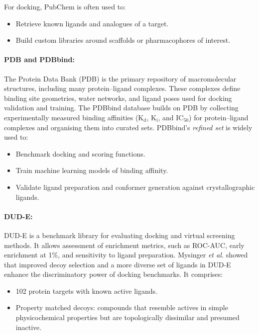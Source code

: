 \documentclass[12pt]{article}
\begin{document}
For docking, PubChem is often used to:
\begin{itemize}
  \item Retrieve known ligands and analogues of a target.
  \item Build custom libraries around scaffolds or pharmacophores of interest.
\end{itemize}

\paragraph{PDB and PDBbind:}

The Protein Data Bank (PDB)\cite{CH6_Berman2000} is the primary repository of macromolecular structures, including many protein–ligand complexes. These complexes define binding site geometries, water networks, and ligand poses used for docking validation and training. The PDBbind\cite{CH6_WangPDBbind} database builds on PDB by collecting experimentally measured binding affinities ($\textrm{K}_\textrm{d}$, $\textrm{K}_\textrm{i}$, and $\textrm{IC}_\textrm{50}$) for protein–ligand complexes and organising them into curated sets. PDBbind's \emph{refined set} is widely used to:

\begin{itemize}
  \item Benchmark docking and scoring functions.
  \item Train machine learning models of binding affinity.
  \item Validate ligand preparation and conformer generation against crystallographic ligands.
\end{itemize}

\paragraph{DUD-E:}

DUD-E\cite{CH6_Mysinger2012} is a benchmark library for evaluating docking and virtual screening methods. It allows assessment of enrichment metrics, such as ROC-AUC, early enrichment at 1\%, and sensitivity to ligand preparation. Mysinger \emph{et al.} showed that improved decoy selection and a more diverse set of ligands in DUD-E enhance the discriminatory power of docking benchmarks.
It comprises:
\begin{itemize}
  \item 102 protein targets with known active ligands.
  \item Property matched decoys: compounds that resemble actives in simple physicochemical properties but are topologically dissimilar and presumed inactive.
\end{itemize}
\end{document}

